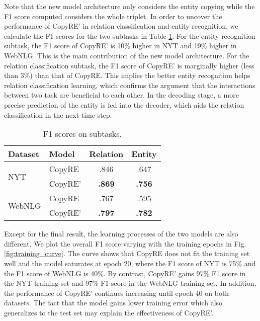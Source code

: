 \documentclass[letterpaper]{article} \usepackage{aaai20}  \usepackage{times}  \usepackage{helvet} \usepackage{courier}  \usepackage[hyphens]{url}  \usepackage{graphicx}
\begin{document}
      
      Note that the new model architecture only considers the entity copying while the F1 score computed considers the whole triplet. 
      In order to uncover the performance of CopyRE' in relation classification and entity recognition, we calculate the F1 scores for the two subtasks in Table \ref{tab:subtask}.  
      For the entity recognition subtask, the F1 score of CopyRE' is 10\%  higher in NYT and 19\% higher in WebNLG. This is the main contribution of the new model architecture. 
      For the relation classification subtask, the F1 score of CopyRE' is marginally higher (less than 3\%) than that of CopyRE. 
      This implies the better entity recognition helps relation classification learning, which confirms the argument that the interactions between two task are beneficial to each other. 
      In the decoding stage, a more precise prediction of the entity is fed into the decoder, which aids the relation classification in the next time step.
      
      \begin{table}[t]
          \centering
          \begin{tabular}{l|l|cc}
              \hline
              Dataset & \multicolumn{1}{l|}{Model} & Relation & \multicolumn{1}{r}{Entity} \\ \hline
              \multirow{2}{*}{NYT} & CopyRE & .846 & .647 \\
              & CopyRE' & \textbf{.869} & \textbf{.756} \\ \hline
              \multirow{2}{*}{WebNLG} & CopyRE & .767 & .595 \\
              & CopyRE' & \textbf{.797} & \textbf{.782} \\ \hline
          \end{tabular}
          \caption{F1 scores on subtasks.}
          \label{tab:subtask}
      \end{table}
      




      
      
      Except for the final result, the learning processes of the two models are also different. 
      We plot the overall F1 score varying with the training epochs in Fig. \ref{fig:training_curve}. 
      The curve shows that CopyRE does not fit the training set well and the model saturates at epoch 20, where the F1 score of NYT is 75\% and the F1 score of WebNLG is 40\%. 
      By contrast, CopyRE' gains 97\% F1 score in the NYT training set and 97\% F1 score in the WebNLG training set. 
      In addition, the performance of CopyRE' continues increasing until epoch 40 on both datasets. 
      The fact that the model gains lower training error which also generalizes to the test set may explain the effectiveness of CopyRE'. 
  
\end{document}
